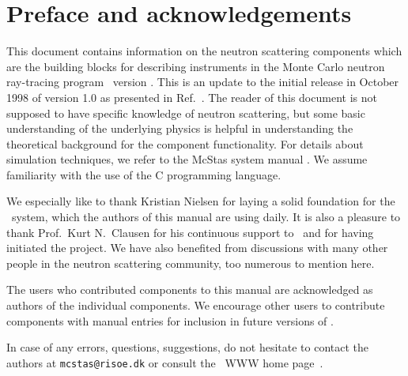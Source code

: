 
\chapter*{Preface and acknowledgements}
This document contains information on the neutron scattering components 
which are the building blocks for describing instruments 
in the Monte Carlo neutron
ray-tracing program \MCS\ version \version . This is an update to the initial
release in October 1998 of version 1.0 as presented in Ref.~\cite{nn_10_20}. 
The reader of this
document is not supposed to have specific knowledge of neutron scattering,
but some basic understanding of the underlying physics is helpful in
understanding the theoretical background for the component functionality. 
For details about simulation techniques, we refer to 
the McStas system manual \cite{mcstasmanual}.
We assume familiarity with the use of 
the C programming language.

We especially like to thank Kristian Nielsen for laying a solid foundation
for the \MCS\ system, which the authors of this manual are using daily.
It is also a pleasure to thank Prof.~Kurt N.~Clausen for his continuous
support to \MCS\ and for having initiated the project.
We have also benefited
from discussions with many other people in the neutron scattering
community, too numerous to mention here.

The users who contributed components to this manual are acknowledged
as authors of the individual components. We encourage other
users to contribute components with manual entries for inclusion in
future versions of \MCS.

In case of any errors, questions, suggestions, 
do not hesitate to 
contact the authors at \verb+mcstas@risoe.dk+
or consult the \MCS\ WWW home page~\cite{mcstas_webpage}.


